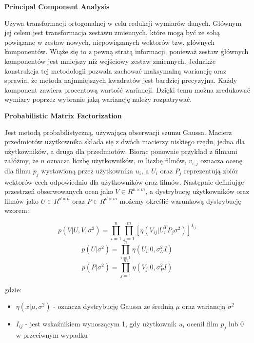 \bigskip

\textbf{Principal Component Analysis}

Używa transformacji ortogonalnej w celu redukcji wymiarów danych. Głównym jej celem jest transformacja zestawu zmiennych, które mogą być ze sobą powiązane w zestaw nowych, niepowiązanych wektorów tzw. głównych komponentów. Wiąże się to z pewną stratą informacji, ponieważ zestaw głównych komponentów jest mniejszy niż wejściowy zestaw zmiennych. Jednakże konstrukcja tej metodologii pozwala zachować maksymalną wariancję oraz sprawia, że metoda najmniejszych kwadratów jest bardziej precyzyjna. Każdy komponent zawiera procentową wartość wariancji. Dzięki temu można zredukować wymiary poprzez wybranie jaką wariancję należy rozpatrywać.

\bigskip


\textbf{Probabilistic Matrix Factorization}


Jest metodą probabilistyczną, używającą obserwacji szumu Gaussa. Macierz przedmiotów użytkownika składa się z dwóch macierzy niskiego rzędu, jedna dla użytkowników, a druga dla przedmiotów. Biorąc ponownie przykład z filmami załóżmy, że $n$ oznacza liczbę użytkowników, $m$ liczbę filmów, $v_{i,j}$ oznacza ocenę dla filmu $p_j$ wystawioną przez użytkownika $u_i$, a $U_i$ oraz $P_j$ reprezentują zbiór wektorów cech odpowiednio dla użytkowników oraz filmów. Następnie definiując przestrzeń obserwowanych ocen jako $V \in R^{n \times m}$, a dystrybucję użytkowników oraz filmów jako $U \in R^{d \times n}$ oraz $P \in R^{d \times m}$ możemy określić warunkową dystrybucję wzorem:

\begin{equation}
p(V|U,V, \sigma^2) = \prod_{i=1}^{n} \prod_{j=1}^{m} [\eta(V_{ij} | U^{T}_i P_j \sigma^2) ]^{I_{ij}}
\end{equation}
\begin{equation}
p(U|\sigma^2) = \prod_{i=1}^{n} \eta (U_i | 0, \sigma^{2}_U I)
\end{equation}
\begin{equation}
p(P|\sigma^2) = \prod_{j=1}^{m} \eta (V_j | 0, \sigma^{2}_P I)
\end{equation}

gdzie:
\begin{itemize}
	\item[] $\eta(x|\mu, \sigma^2)$ - oznacza dystrybucję Gaussa ze średnią $\mu$ oraz wariancją $\sigma^2$
	\item[] $I_{ij}$ - jest wskaźnikiem wynoszącym 1, gdy użytkownik $u_i$ ocenił film $p_j$ lub 0 w przeciwnym wypadku
\end{itemize}
\newpage

